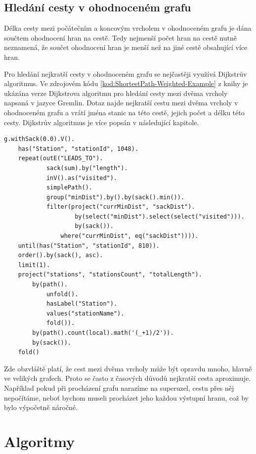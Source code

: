 \documentclass[
  program=infoi,
  biblatex=true,
  figures=true,
  glossaries=false,
  index,
  sourcecodes=true
]{kidiplom}
\begin{document}
\subsection{Hledání cesty v ohodnoceném grafu}
\label{sec:weightedPath}
Délka cesty mezi počátečním a koncovým vrcholem v ohodnoceném grafu je dána součtem ohodnocení hran na cestě. Tedy nejmenší počet hran na cestě nutně neznamená, že součet ohodnocení hran je menší než na jiné cestě obsahující více hran.

Pro hledání nejkratší cesty v ohodnoceném grafu se nejčastěji využívá Dijkstrův algoritmus. Ve zdrojovém kódu \ref{kod:ShortestPath-Weighted-Example} z knihy \cite{practitioner} je ukázána verze Dijkstrova algoritmu pro hledání cesty mezi dvěma vrcholy napsaná v jazyce Gremlin. Dotaz najde nejkratší cestu mezi dvěma vrcholy v ohodnoceném grafu a vrátí jména stanic na této cestě, jejich počet a délku této cesty. Dijkstrův algoritmus je více popsán v následující kapitole. 

\begin{listing}[h]
\begin{verbatim}
g.withSack(0.0).V().
    has("Station", "stationId", 1048).
    repeat(outE("LEADS_TO").
            sack(sum).by("length").
            inV().as("visited").
            simplePath().
            group("minDist").by().by(sack().min()).
            filter(project("currMinDist", "sackDist").
                    by(select("minDist").select(select("visited"))).
                    by(sack()).
                where("currMinDist", eq("sackDist")))).
    until(has("Station", "stationId", 810)).
    order().by(sack(), asc).
    limit(1).
    project("stations", "stationsCount", "totalLength").
        by(path().
            unfold().
            hasLabel("Station").
            values("stationName").
            fold()).
        by(path().count(local).math('(_+1)/2')).
        by(sack()).
    fold() 
\end{verbatim}
\caption[Nejkratší cesta v ohodnoceném grafu.]{Hledání nejkratší cesty v ohodnoceném grafu.}
\label{kod:ShortestPath-Weighted-Example}
\end{listing}

Zde obzvláště platí, že cest mezi dvěma vrcholy může být opravdu mnoho, hlavně ve velikých grafech. Proto se často z časových důvodů nejkratší cesta aproximuje. Například pokud při procházení grafu narazíme na superuzel, cestu přes něj nepočítáme, neboť bychom museli procházet jeho každou výstupní hranu, což by bylo výpočetně náročné.
\clearpage
\section{Algoritmy}
\end{document}
